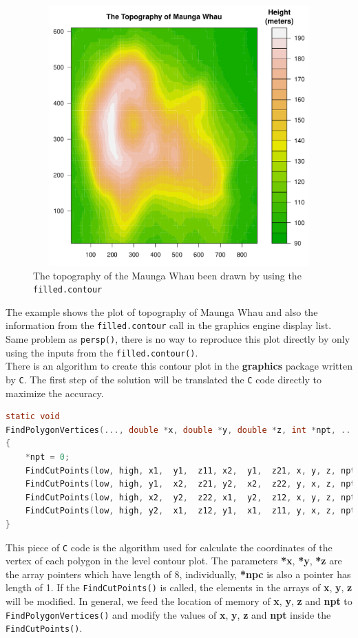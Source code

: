\documentclass[paper=a4, fontsize=11pt]{report}
\begin{document}
\begin{figure}[h]
	\begin{center}
		\includegraphics[height = 10cm, width = 12cm]{figure/filled_example_1.pdf}
		\caption{The topography of the Maunga Whau been drawn by using the \texttt{filled.contour}}
		\label{figure_3.6}
	\end{center}
\end{figure}
The example shows the plot of topography of Maunga Whau and also the information from the \texttt{filled.contour} call in the graphics engine display list. Same problem as \texttt{persp()}, there is no way to reproduce this plot directly by only using the inputs from the \texttt{filled.contour()}.\\

There is an algorithm to create this contour plot in the \textbf{graphics} package written by \texttt{C}. The first step of the solution will be translated the \texttt{C} code directly to maximize the accuracy.\\

\begin{lstlisting}[language = C]
static void
FindPolygonVertices(..., double *x, double *y, double *z, int *npt, ...)
{
    *npt = 0;
    FindCutPoints(low, high, x1,  y1,  z11, x2,  y1,  z21, x, y, z, npt);
    FindCutPoints(low, high, y1,  x2,  z21, y2,  x2,  z22, y, x, z, npt);
    FindCutPoints(low, high, x2,  y2,  z22, x1,  y2,  z12, x, y, z, npt);
    FindCutPoints(low, high, y2,  x1,  z12, y1,  x1,  z11, y, x, z, npt);
}
\end{lstlisting}
This piece of \texttt{C} code is the algorithm used for calculate the coordinates of the vertex of each polygon in the level contour plot. The parameters \textbf{*x}, \textbf{*y}, \textbf{*z} are the array pointers which have length of 8, individually, \textbf{*npc} is also a pointer has length of 1. If the \texttt{FindCutPoints()} is called, the elements in the arrays of \textbf{x}, \textbf{y}, \textbf{z} will be modified. In general, we feed the location of memory of \textbf{x}, \textbf{y}, \textbf{z} and \textbf{npt} to \texttt{FindPolygonVertices()} and modify the values of \textbf{x}, \textbf{y}, \textbf{z} and \textbf{npt} inside the \texttt{FindCutPoints()}.\\
\end{document}
